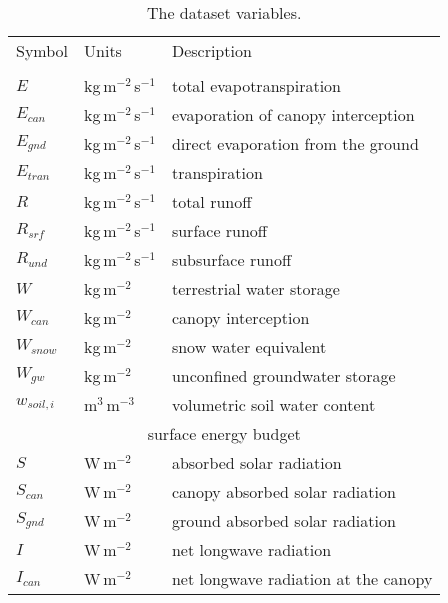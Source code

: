 \begin{table}[t]
    \caption{The dataset variables.}
    \label{tbl:variables}
    \centering
    \begin{tabular}{lll}
        \tophline
        Symbol       & Units                  & Description \\
        \middlehline
        \multicolumn{3}{c}{surface water budget}                                            \\
        $E$          & kg\,m$^{-2}$\,s$^{-1}$ & total evapotranspiration \\
        $E_{can}$    & kg\,m$^{-2}$\,s$^{-1}$ & evaporation of canopy interception \\
        $E_{gnd}$    & kg\,m$^{-2}$\,s$^{-1}$ & direct evaporation from the ground \\
        $E_{tran}$   & kg\,m$^{-2}$\,s$^{-1}$ & transpiration \\
        $R$          & kg\,m$^{-2}$\,s$^{-1}$ & total runoff \\
        $R_{srf}$    & kg\,m$^{-2}$\,s$^{-1}$ & surface runoff \\
        $R_{und}$    & kg\,m$^{-2}$\,s$^{-1}$ & subsurface runoff \\
        $W$          & kg\,m$^{-2}$           & terrestrial water storage \\
        $W_{can}$    & kg\,m$^{-2}$           & canopy interception \\
        $W_{snow}$   & kg\,m$^{-2}$           & snow water equivalent \\
        $W_{gw}$     & kg\,m$^{-2}$           & unconfined groundwater storage \\
        $w_{soil,i}$ & m$^{3}$\,m$^{-3}$      & volumetric soil water content \\
        [1mm]
        \multicolumn{3}{c}{surface energy budget}                                           \\
        $S$          & W\,m$^{-2}$            & absorbed solar radiation \\
        $S_{can}$    & W\,m$^{-2}$            & canopy absorbed solar radiation \\
        $S_{gnd}$    & W\,m$^{-2}$            & ground absorbed solar radiation \\
        $I$          & W\,m$^{-2}$            & net longwave radiation \\
        $I_{can}$    & W\,m$^{-2}$            & net longwave radiation at the canopy \\

\end{tabular}
\end{table}
